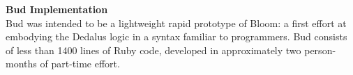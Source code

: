 

\textbf{Bud Implementation}\\
Bud was intended to be a lightweight rapid prototype of Bloom: a first effort at embodying the Dedalus logic in a syntax familiar to programmers.  Bud consists of less than 1400 lines of Ruby code, developed in approximately two person-months of part-time effort.


\begin{comment}
A Bud program is just a Ruby class definition.  To make it operational, a small amount of imperative Ruby code is needed to create an instance of the class and invoke the Bud \texttt{run} method.  This imperative code can then be launched on as many nodes as desired (e.g., via the popular Capistrano package for Ruby deployments).  Messages targeted at those nodes are handled according to the Bud specification.  As an alternative to the \texttt{run} method, the Bud class also provides a \texttt{tick} method that can be used to force evaluation of a single timestep; this is useful for debugging Bloom code with standard Ruby debugging tools, or for executing a Bud specification that is intended as a ``one-shot'' query.

\jmh{The next paragraph could easily be chopped.  The preceding paragraph too, but it's more important to understand how things work.}
Because Bud is pure Ruby, some programmers may choose to embed it as a Domain-Specific Language within traditional imperative Ruby code.  In fact, nothing prevents a subclass of Bud from having both Bloom code in \texttt{declare} methods and imperative code in traditional Ruby methods.  This is a fairly common usage model, akin to using the Ruby on Rails package to integrate declarative data management statements with imperative Ruby. A mixture of declarative Bloom methods and imperative Ruby allows the full range of existing Ruby code---including the extensive RubyGems repositories---to be combined with checkable distributed Bloom programs. The analyses we describe in the remaining sections still apply in these cases; the imperative Ruby code interacts with the Bloom logic in the same way as any external agent sending network messages.
\end{comment}
